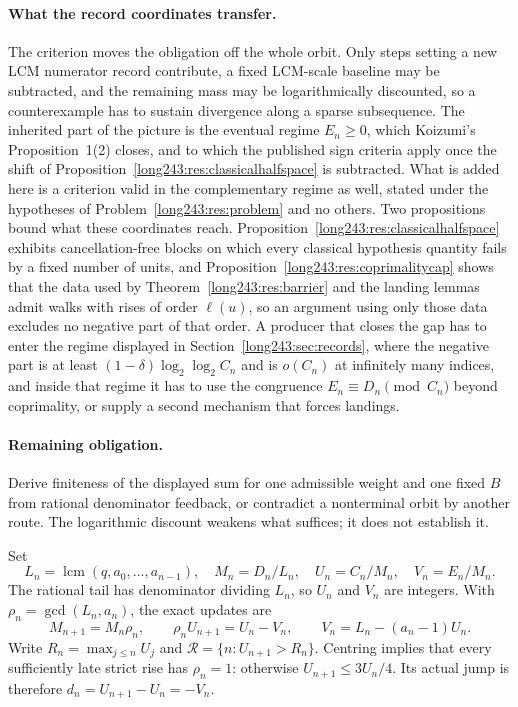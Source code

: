 \paragraph{What the record coordinates transfer.}
The criterion moves the obligation off the whole orbit.  Only steps setting a
new LCM numerator record contribute, a fixed LCM-scale baseline may be
subtracted, and the remaining mass may be logarithmically discounted, so a
counterexample has to sustain divergence along a sparse subsequence.  The
inherited part of the picture is the eventual regime $E_n\ge0$, which Koizumi's
Proposition~1(2) closes, and to which the published sign criteria apply once
the shift of Proposition~\ref{long243:res:classicalhalfspace} is subtracted.  What is
added here is a criterion valid in the complementary regime as well, stated
under the hypotheses of Problem~\ref{long243:res:problem} and no others.  Two
propositions bound what these coordinates reach.
Proposition~\ref{long243:res:classicalhalfspace} exhibits cancellation-free blocks on
which every classical hypothesis quantity fails by a fixed number of units, and
Proposition~\ref{long243:res:coprimalitycap} shows that the data used by
Theorem~\ref{long243:res:barrier} and the landing lemmas admit walks with rises of
order $\ell(u)$, so an argument using only those data excludes no negative
part of that order.  A producer that closes the gap has to enter the regime
displayed in Section~\ref{long243:sec:records}, where the negative part is at least
$(1-\delta)\log_2\log_2C_n$ and is $o(C_n)$ at infinitely many indices, and
inside that regime it has to use the congruence $E_n\equiv D_n\pmod{C_n}$
beyond coprimality, or supply a second mechanism that forces landings.

\paragraph{Remaining obligation.}
Derive finiteness of the displayed sum for one admissible weight and one fixed
$B$ from rational denominator feedback, or contradict a nonterminal orbit by
another route.  The logarithmic discount weakens what suffices; it does not
establish it.

Set
\[
 L_n=\operatorname{lcm}(q,a_0,\ldots,a_{n-1}),\quad
 M_n=D_n/L_n,\quad U_n=C_n/M_n,\quad V_n=E_n/M_n.
\]
The rational tail has denominator dividing $L_n$, so $U_n$ and $V_n$ are
integers. With $\rho_n=\gcd(L_n,a_n)$, the exact updates are
\[
 M_{n+1}=M_n\rho_n,\qquad
 \rho_nU_{n+1}=U_n-V_n,\qquad V_n=L_n-(a_n-1)U_n.
\]
Write $R_n=\max_{j\le n}U_j$ and
$\mathcal R=\{n:U_{n+1}>R_n\}$. Centring implies that every sufficiently
late strict rise has $\rho_n=1$: otherwise $U_{n+1}\le3U_n/4$.
Its actual jump is therefore $d_n=U_{n+1}-U_n=-V_n$.

